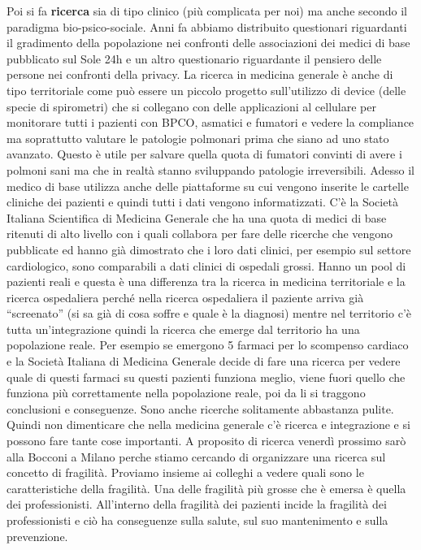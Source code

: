 \documentclass[]{article}
\begin{document}
Poi si fa \textbf{ricerca} sia di tipo clinico (più complicata per noi)
ma anche secondo il paradigma bio-psico-sociale. Anni fa abbiamo
distribuito questionari riguardanti il gradimento della popolazione nei
confronti delle associazioni dei medici di base pubblicato sul Sole 24h
e un altro questionario riguardante il pensiero delle persone nei
confronti della privacy. La ricerca in medicina generale è anche di tipo
territoriale come può essere un piccolo progetto sull'utilizzo di device
(delle specie di spirometri) che si collegano con delle applicazioni al
cellulare per monitorare tutti i pazienti con BPCO, asmatici e fumatori
e vedere la compliance ma soprattutto valutare le patologie polmonari
prima che siano ad uno stato avanzato. Questo è utile per salvare quella
quota di fumatori convinti di avere i polmoni sani ma che in realtà
stanno sviluppando patologie irreversibili. Adesso il medico di base
utilizza anche delle piattaforme su cui vengono inserite le cartelle
cliniche dei pazienti e quindi tutti i dati vengono informatizzati. C'è
la Società Italiana Scientifica di Medicina Generale che ha una quota di
medici di base ritenuti di alto livello con i quali collabora per fare
delle ricerche che vengono pubblicate ed hanno già dimostrato che i loro
dati clinici, per esempio sul settore cardiologico, sono comparabili a
dati clinici di ospedali grossi. Hanno un pool di pazienti reali e
questa è una differenza tra la ricerca in medicina territoriale e la
ricerca ospedaliera perché nella ricerca ospedaliera il paziente arriva
già ``screenato'' (si sa già di cosa soffre e quale è la diagnosi)
mentre nel territorio c'è tutta un'integrazione quindi la ricerca che
emerge dal territorio ha una popolazione reale. Per esempio se emergono
5 farmaci per lo scompenso cardiaco e la Società Italiana di Medicina
Generale decide di fare una ricerca per vedere quale di questi farmaci
su questi pazienti funziona meglio, viene fuori quello che funziona più
correttamente nella popolazione reale, poi da li si traggono conclusioni
e conseguenze. Sono anche ricerche solitamente abbastanza pulite. Quindi
non dimenticare che nella medicina generale c'è ricerca e integrazione e
si possono fare tante cose importanti. A proposito di ricerca venerdì
prossimo sarò alla Bocconi a Milano perche stiamo cercando di
organizzare una ricerca sul concetto di fragilità. Proviamo insieme ai
colleghi a vedere quali sono le caratteristiche della fragilità. Una
delle fragilità più grosse che è emersa è quella dei professionisti.
All'interno della fragilità dei pazienti incide la fragilità dei
professionisti e ciò ha conseguenze sulla salute, sul suo mantenimento e
sulla prevenzione.
\end{document}
